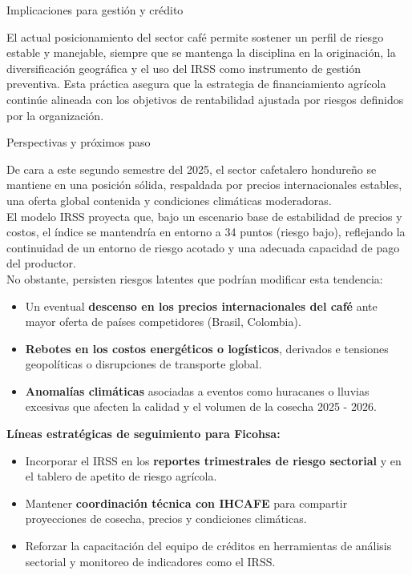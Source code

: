 \documentclass[final]{beamer}
\newlength{\colwidth}
\begin{document}
\begin{frame}[t]
\begin{columns}[t]
\begin{column}{\colwidth}
\begin{exampleblock}{Implicaciones para gestión y crédito}
\begin{enumerate}
  \end{enumerate}
El actual posicionamiento del sector café permite sostener un perfil de riesgo estable y manejable, siempre que se mantenga la disciplina en la originación, la diversificación geográfica y el uso del IRSS como instrumento de gestión preventiva. Esta práctica asegura que la estrategia de financiamiento agrícola continúe alineada con los objetivos de rentabilidad ajustada por riesgos definidos  por la organización. 
  \end{exampleblock}
  \begin{block}{Perspectivas y próximos paso}
  
  De cara a este segundo semestre del 2025, el sector cafetalero hondureño se mantiene en una posición sólida, respaldada por precios internacionales estables, una oferta global contenida y condiciones climáticas moderadoras. \\[0.4cm]
  
  El modelo IRSS proyecta que, bajo un escenario base de estabilidad de precios y costos, el índice se mantendría en entorno a 34 puntos (riesgo bajo), reflejando la continuidad de un entorno de riesgo acotado y una adecuada capacidad de pago del productor. \\[0.4cm]
  
  No obstante, persisten riesgos latentes que podrían modificar esta tendencia: 
  \begin{itemize}
  \item Un eventual \textbf{descenso en los precios internacionales del café} ante mayor oferta de países competidores (Brasil, Colombia). 
  \item \textbf{Rebotes en los costos energéticos o logísticos}, derivados e tensiones geopolíticas o disrupciones de transporte global. 
  \item \textbf{Anomalías climáticas} asociadas a eventos como huracanes o lluvias excesivas que afecten la calidad y el volumen de la cosecha 2025 - 2026. 
  \end{itemize}
\textbf{Líneas estratégicas de seguimiento para Ficohsa:}\\
\begin{itemize}
\item Incorporar el IRSS en los \textbf{reportes trimestrales de riesgo sectorial} y en el tablero de apetito de riesgo agrícola. 
\item Mantener \textbf{coordinación técnica con IHCAFE} para compartir proyecciones de cosecha, precios y condiciones climáticas. 
\item Reforzar la capacitación del equipo de créditos en herramientas de análisis sectorial y monitoreo de indicadores como el IRSS. 
\end{itemize}


\end{block}
\end{column}
\end{columns}
\end{frame}
\end{document}
